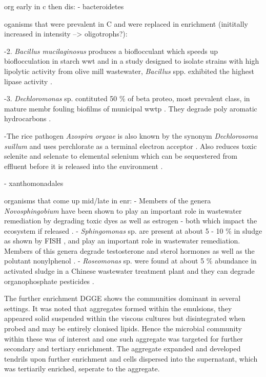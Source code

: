 \documentclass[11pt]{article}
\begin{document}
org early in c then dis:
- bacteroidetes

oganisms that were prevalent in C and were replaced in enrichment (inititally increased in intensity --> oligotrophs?):

-2. \emph{Bacillus mucilaginosus} produces a bioflocculant which speeds up bioflocculation in starch wwt \cite{deng2003characteristics} and in a study designed to isolate strains with high lipolytic activity from olive mill wastewater, \emph{Bacillus} spp. exhibited the highest lipase activity \cite{ertuugrul2007isolation}.

-3. \emph{Dechloromonas} sp. contituted 50 \% of beta proteo, most prevalent class,  in mature membr fouling biofilms of municipal wwtp \cite{miura2007membrane}. They degrade poly aromatic hydrocarbons \cite{oshiki2008pha}.

-The rice pathogen \emph{Azospira oryzae} is also known by the synonym \emph{Dechlorosoma suillum} and uses perchlorate as a terminal electron acceptor  \cite{reinhold2000reassessment,tan2003dechlorosoma}. Also reduces toxic selenite and selenate to elemental selenium which can be sequestered from effluent before it is released into the environment \cite{hunter2007azospira,wilhelmus2013microbiological}.

- xanthomonadales

organisms that come up mid/late in enr:
- Members of the genera \emph{Novosphingobium} have been shown to play an important role in wastewater remediation by degrading toxic dyes as well as estrogen - both which impact the ecosystem if released \cite{addison2007novosphingobium,hashimoto2009contribution}.
- \emph{Sphingomonas} sp. are present at about 5 - 10 \% in sludge as shown by FISH \cite{neef1999detection}, and play an important role in wastewater remediation. Members of this genera degrade testosterone and sterol hormones as well as the polutant nonylphenol \cite{fujii2001sphingomonas,roh201017beta}.
- \emph{Roseomonas} sp. were found at about 5 \% abundance in activated sludge in a Chinese wastewater treatment plant and they can degrade organophosphate pesticides \cite{jiang2008bacterial,jiang2006isolation}.


The further enrichment DGGE shows the communities dominant in several settings. It was noted that aggregates formed within the emulsions, they appeared solid suspended within the viscous cultures but disintegrated when probed and may be entirely clonised lipids. Hence the microbial community within these was of interest and one such aggregate was targeted for further secondary and tertiary enrichment. The aggregate expanded and developed tendrils upon further enrichment and    cells dispersed into the supernatant, which was tertiarily enriched, seperate to the aggregate.
\end{document}
